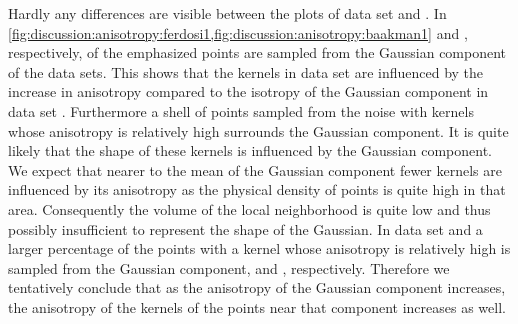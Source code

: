 				Hardly any differences are visible between the plots of data set \ferdosiOne and \baakmanOne. 
					In \cref{fig:discussion:anisotropy:ferdosi1,fig:discussion:anisotropy:baakman1}  and , respectively, of the emphasized points are sampled from the Gaussian component of the data sets. This shows that the kernels in data set \baakmanOne are influenced by the increase in anisotropy compared to the isotropy of the Gaussian component in data set \ferdosiOne.
					Furthermore a shell of points sampled from the noise with kernels whose anisotropy is relatively high surrounds the Gaussian component. It is quite likely that the shape of these kernels is influenced by the Gaussian component.
					We expect that nearer to the mean of the Gaussian component fewer kernels are influenced by its anisotropy as the physical density of points is quite high in that area. Consequently the volume of the local neighborhood is quite low and thus possibly insufficient to represent the shape of the Gaussian.
				In data set \baakmanFour and \baakmanFive a larger percentage of the points with a kernel whose anisotropy is relatively high is sampled from the Gaussian component,  and , respectively. 
				Therefore we tentatively conclude that as the anisotropy of the Gaussian component increases, the anisotropy of the kernels of the points near that component increases as well.
		
